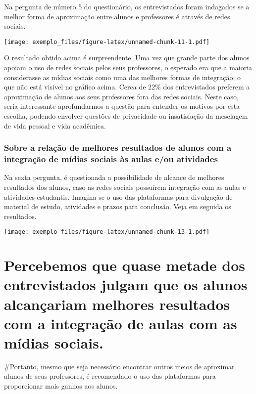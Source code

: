 \documentclass[]{article}
\begin{document}
Na pergunta de número 5 do questionário, os entrevistados foram
indagados se a melhor forma de aproximação entre alunos e professores é
através de redes sociais.

\texttt{[image: exemplo\_files/figure-latex/unnamed-chunk-11-1.pdf]}

O resultado obtido acima é surpreendente. Uma vez que grande parte dos
alunos apoiam o uso de redes sociais pelos seus professores, o esperado
era que a maioria considerasse as mídias sociais como uma das melhores
formas de integração; o que não está visível no gráfico acima. Cerca de
22\% dos entrevistados preferem a aproximação de alunos aos seus
professores fora das redes sociais. Neste caso, seria interessante
aprofundarmos a questão para entender os motivos por esta escolha,
podendo envolver questões de privacidade ou insatisfação da mesclagem de
vida pessoal e vida acadêmica.

\subsubsection{Sobre a relação de melhores resultados de alunos com a
integração de mídias sociais às aulas e/ou
atividades}\label{sobre-a-relacao-de-melhores-resultados-de-alunos-com-a-integracao-de-midias-sociais-as-aulas-eou-atividades}

Na sexta pergunta, é questionada a possibilidade de alcance de melhores
resultados dos alunos, caso as redes sociais possuírem integração com as
aulas e atividades estudantis. Imagina-se o uso das plataformas para
divulgação de material de estudo, atividades e prazos para conclusão. \n
Veja em seguida os resultados.

\texttt{[image: exemplo\_files/figure-latex/unnamed-chunk-13-1.pdf]}

\section{Percebemos que quase metade dos entrevistados julgam que os
alunos alcançariam melhores resultados com a integração de aulas com as
mídias
sociais.}\label{percebemos-que-quase-metade-dos-entrevistados-julgam-que-os-alunos-alcancariam-melhores-resultados-com-a-integracao-de-aulas-com-as-midias-sociais.}

\n
\#Portanto, mesmo que seja necessário encontrar outros meios de
aproximar alunos de seus professores, é recomendado o uso das
plataformas para proporcionar mais ganhos aos alunos.
\end{document}
